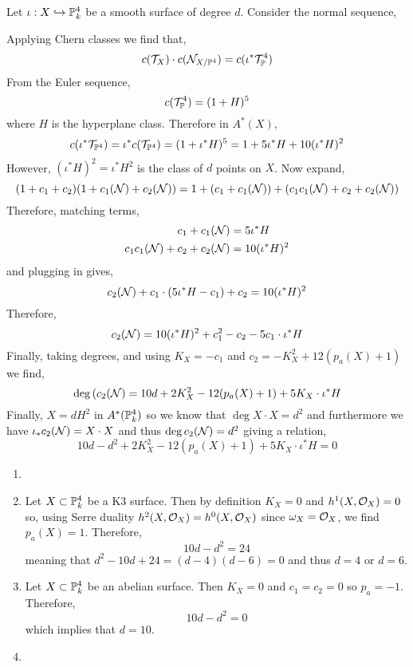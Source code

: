 \documentclass[12pt]{article}
\begin{document}
Let $\iota : X \embed \P^4_k$ be a smooth surface of degree $d$. Consider the normal sequence,
\begin{center}
\end{center}
Applying Chern classes we find that,
\[ c(\T_X) \cdot c(\sN_{X/\P^4}) = c(\iota^* \T_\P^4) \]
From the Euler sequence,
\[ c(\T_\P^4) = (1 + H)^5 \]
where $H$ is the hyperplane class. Therefore in $A^*(X)$,
\[ c(\iota^* \T_{\P^4}) = \iota^* c(\T_{\P^4}) = (1 + \iota^* H)^5  = 1 + 5 \iota^* H + 10 (\iota^* H)^2 \]
However, $(\iota^* H)^2 = \iota^* H^2$ is the class of $d$ points on $X$. Now expand,
\[ (1 + c_1 + c_2)(1 + c_1(\sN) + c_2(\sN)) = 1 + (c_1 + c_1(\sN)) + (c_1 c_1(\sN) + c_2 + c_2(\sN)) \]
Therefore, matching terms,
\begin{align*}
c_1 + c_1(\sN) & = 5 \iota^* H
\\
c_1 c_1(\sN) + c_2 + c_2(\sN) &= 10 (\iota^* H)^2
\end{align*}
and plugging in gives,
\[ c_2(\sN) + c_1 \cdot (5 \iota^* H - c_1) + c_2 = 10 (\iota^* H)^2 \]
Therefore, 
\[ c_2(\sN) = 10 (\iota^* H)^2 + c_1^2 - c_2 - 5 c_1 \cdot \iota^* H \]
Finally, taking degrees, and using $K_X = - c_1$ and $c_2 = - K_X^2 + 12(p_a(X) + 1)$ we find,
\[ \deg{(c_2(\sN)} = 10 d + 2  K_X^2 - 12(p_a(X) + 1) + 5 K_X \cdot \iota^* H \]
Finally, $X = d H^2$ in $A^*(\P^4_k)$ so we know that $\deg{X \cdot X} = d^2$ and furthermore we have $\iota_* c_2(\sN) = X \cdot X$ and thus $\deg{c_2(\sN)} = d^2$ giving a relation,
\[ 10 d - d^2 + 2  K_X^2 - 12(p_a(X) + 1) + 5 K_X \cdot \iota^* H = 0 \]

\begin{enumerate}
\item 

\item Let $X \subset \P^4_k$ be a K3 surface. Then by definition $K_X = 0$ and $h^1(X, \struct{X}) = 0$ so, using Serre duality $h^2(X, \struct{X}) = h^0(X, \struct{X})$ since $\omega_X = \struct{X}$, we find $p_a(X) = 1$. Therefore,
\[ 10 d - d^2 = 24 \]
meaning that $d^2 - 10 d + 24 = (d - 4)(d - 6) = 0$ and thus $d = 4$ or $d = 6$.

\item Let $X \subset \P^4_k$ be an abelian surface. Then $K_X = 0$ and $c_1 = c_2 = 0$ so $p_a = -1$. Therefore,
\[ 10 d - d^2 = 0 \]
which implies that $d = 10$.

\item 
\end{enumerate}
\end{document}
